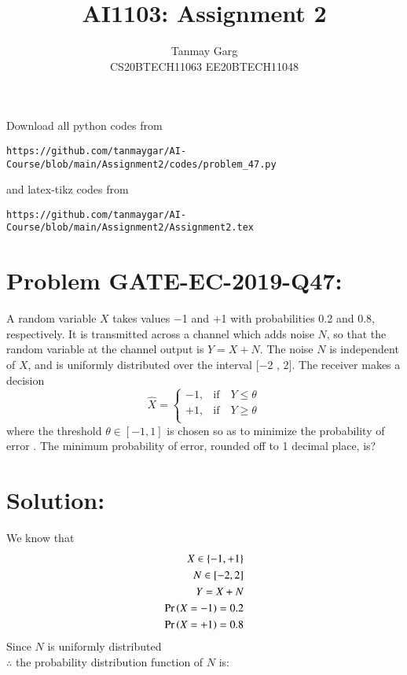 \documentclass[journal,12pt,twocolumn]{IEEEtran}
\begin{document}
     \def\rightbox#1{\makebox[0in][r]{#1}}
     \def\centbox#1{\makebox[0in]{#1}}
     \def\topbox#1{\raisebox{-\baselineskip}[0in][0in]{#1}}
     \def\midbox#1{\raisebox{-0.5\baselineskip}[0in][0in]{#1}}
\vspace{3cm}
\title{AI1103: Assignment 2}
\author{Tanmay Garg \\CS20BTECH11063 EE20BTECH11048}
\maketitle
\newpage
\bigskip
\renewcommand{\thefigure}{\theenumi}
\renewcommand{\thetable}{\theenumi}
Download all python codes from 
\begin{lstlisting}
https://github.com/tanmaygar/AI-Course/blob/main/Assignment2/codes/problem_47.py
\end{lstlisting}
%
and latex-tikz codes from 
%
\begin{lstlisting}
https://github.com/tanmaygar/AI-Course/blob/main/Assignment2/Assignment2.tex
\end{lstlisting}

\section*{Problem GATE-EC-2019-Q47: }
A random variable $X$ takes values −1 and +1 with probabilities 0.2 and 0.8, respectively.
It is transmitted across a channel which adds noise $N$, so that the random variable at the
channel output is $Y = X + N$. The noise $N$ is independent of $X$, and is uniformly
distributed over the interval [−2 , 2]. The receiver makes a decision
\[
\hat{X} = \begin{cases}
            -1, &\text{if}\quad Y \leq \theta \\
             +1, &\text{if}\quad Y \geq \theta\\
            \end{cases}
\]
where the threshold $\theta  \in [−1,1]$ is chosen so as to minimize the probability of error
. The minimum probability of error, rounded off to 1 decimal place, is?
\section*{Solution:}
We know that 
\begin{align}
    X \in \{-1,+1\}\\
    N \in [-2,2]\\
    Y = X + N\\
    \Pr\left(X = -1\right) = 0.2\\
    \Pr\left(X = +1\right) = 0.8
\end{align}
Since $N$ is uniformly distributed\\
$\therefore$ the probability distribution function of $N$ is:
\end{document}
